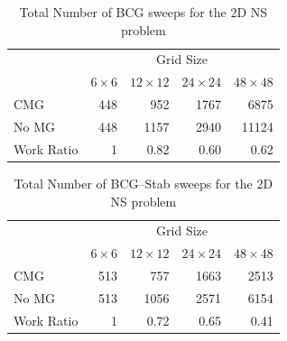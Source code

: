     \begin{table}[hbt]

        \begin{centering}
        
        \caption{Total Number of BCG sweeps for the 2D NS problem}
        \label{table:2D_1}
        \vspace{1ex}
        \begin{tabular}{|l|rrrr|} \hline
                    & \multicolumn{4}{c|}{Grid Size}                  \\
                    & $6\times 6$ & $12\times 12$ 
                    & $24\times 24$ & $48\times 48$ \\ \hline
        CMG         & 448   &  952    & 1767    & 6875    \\ 
        No MG       & 448   &  1157   & 2940    & 11124   \\ \hline
        Work Ratio  & 1     &  0.82   & 0.60    & 0.62    \\ \hline
      \end{tabular}

      \end{centering}
    
    \end{table}
    \begin{table}[hbt]

        \begin{centering}
        
        \caption{Total Number of BCG--Stab sweeps for the 2D NS problem}
        \label{table:2D_2}
        \vspace{1ex}
        \begin{tabular}{|l|rrrr|} \hline
                    & \multicolumn{4}{c|}{Grid Size}                  \\
                    & $6\times 6$ & $12\times 12$ 
                    & $24\times 24$ & $48\times 48$ \\ \hline
        CMG         & 513 & 757       & 1663    & 2513    \\ 
        No MG       & 513 & 1056      & 2571    & 6154    \\ \hline
        Work Ratio  & 1   & 0.72      & 0.65    & 0.41    \\ \hline    
        \end{tabular}

        \end{centering}

    \end{table}        

